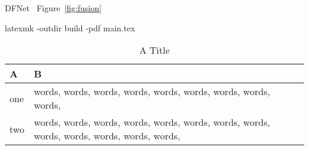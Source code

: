 \usepackage[american]{babel}
\usepackage{microtype}
\graphicspath{{figure/}}

DFNet~\cite{hong2019dfnet}
Figure~\ref{fig:fusion}

\usepackage{amsfonts}

\usepackage{balance}
\balance

latexmk -outdir build -pdf main.tex


\usepackage{xcolor}


\newcommand{\ra}{\textbf{\color{azure(colorwheel)}{R1}}}
\newcommand{\rb}{\textbf{\color{forestgreen(web)}{R2}}}
\newcommand{\rc}{\textbf{\color{awesome}{R3}}}

\usepackage[capitalize]{cleveref}


\begin{table}[t]
    \vskip 0.2in
    \caption{A Title}
    \label{tab:tabularx}
    \begin{center}
        \begin{small}
            \begin{tabularx}{\linewidth}{lX}
                \toprule
                A & B\\
                \midrule
                one & words, words, words, words, words, words, words, words, words,  \\
                two & words, words, words, words, words, words, words, words, words, words, words, words, words, \\
                \bottomrule
            \end{tabularx}
        \end{small}
    \end{center}
    \vskip -0.2in
\end{table}

